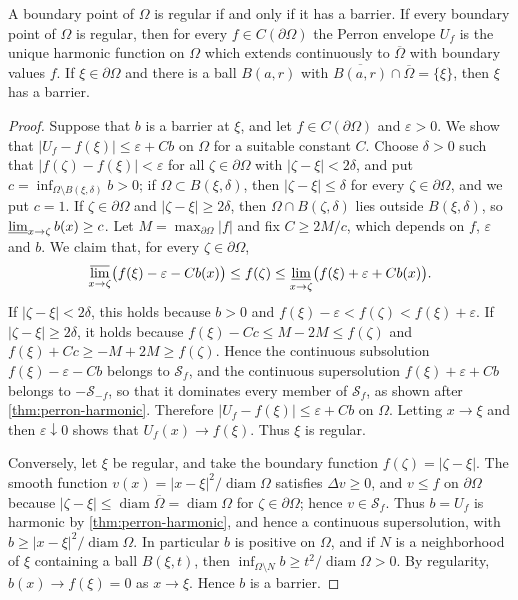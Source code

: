 \begin{theorem}\label{thm:barrier-regularity}
A boundary point of $\Omega$ is regular if and only if it has a barrier. If every boundary point of $\Omega$ is regular, then for every $f\in C(\partial\Omega)$ the Perron envelope $U_f$ is the unique harmonic function on $\Omega$ which extends continuously to $\overline\Omega$ with boundary values $f$. If $\xi\in\partial\Omega$ and there is a ball $B(a,r)$ with $\overline{B(a,r)}\cap\overline\Omega=\{\xi\}$, then $\xi$ has a barrier.
\end{theorem}
\begin{proof}
Suppose that $b$ is a barrier at $\xi$, and let $f\in C(\partial\Omega)$ and $\varepsilon>0$. We show that $|U_f-f(\xi)|\leq\varepsilon+Cb$ on $\Omega$ for a suitable constant $C$. Choose $\delta>0$ such that $|f(\zeta)-f(\xi)|<\varepsilon$ for all $\zeta\in\partial\Omega$ with $|\zeta-\xi|<2\delta$, and put $c=\inf_{\Omega\setminus B(\xi,\delta)}b>0$; if $\Omega\subset B(\xi,\delta)$, then $|\zeta-\xi|\leq\delta$ for every $\zeta\in\partial\Omega$, and we put $c=1$. If $\zeta\in\partial\Omega$ and $|\zeta-\xi|\geq2\delta$, then $\Omega\cap B(\zeta,\delta)$ lies outside $B(\xi,\delta)$, so $\varliminf_{x\to\zeta}b(x)\geq c$. Let $M=\max_{\partial\Omega}|f|$ and fix $C\geq2M/c$, which depends on $f$, $\varepsilon$ and $b$. We claim that, for every $\zeta\in\partial\Omega$,
\[
 \varlimsup_{x\to\zeta}\bigl(f(\xi)-\varepsilon-Cb(x)\bigr)\leq f(\zeta)\leq\varliminf_{x\to\zeta}\bigl(f(\xi)+\varepsilon+Cb(x)\bigr).
\]
If $|\zeta-\xi|<2\delta$, this holds because $b>0$ and $f(\xi)-\varepsilon<f(\zeta)<f(\xi)+\varepsilon$. If $|\zeta-\xi|\geq2\delta$, it holds because $f(\xi)-Cc\leq M-2M\leq f(\zeta)$ and $f(\xi)+Cc\geq-M+2M\geq f(\zeta)$. Hence the continuous subsolution $f(\xi)-\varepsilon-Cb$ belongs to $\mathcal S_f$, and the continuous supersolution $f(\xi)+\varepsilon+Cb$ belongs to $-\mathcal S_{-f}$, so that it dominates every member of $\mathcal S_f$, as shown after \cref{thm:perron-harmonic}. Therefore $|U_f-f(\xi)|\leq\varepsilon+Cb$ on $\Omega$. Letting $x\to\xi$ and then $\varepsilon\downarrow0$ shows that $U_f(x)\to f(\xi)$. Thus $\xi$ is regular.

Conversely, let $\xi$ be regular, and take the boundary function $f(\zeta)=|\zeta-\xi|$. The smooth function $v(x)=|x-\xi|^2/\operatorname{diam}\Omega$ satisfies $\Delta v\geq0$, and $v\leq f$ on $\partial\Omega$ because $|\zeta-\xi|\leq\operatorname{diam}\overline\Omega=\operatorname{diam}\Omega$ for $\zeta\in\partial\Omega$; hence $v\in\mathcal S_f$. Thus $b=U_f$ is harmonic by \cref{thm:perron-harmonic}, and hence a continuous supersolution, with $b\geq|x-\xi|^2/\operatorname{diam}\Omega$. In particular $b$ is positive on $\Omega$, and if $N$ is a neighborhood of $\xi$ containing a ball $B(\xi,t)$, then $\inf_{\Omega\setminus N}b\geq t^2/\operatorname{diam}\Omega>0$. By regularity, $b(x)\to f(\xi)=0$ as $x\to\xi$. Hence $b$ is a barrier.


\end{proof}
